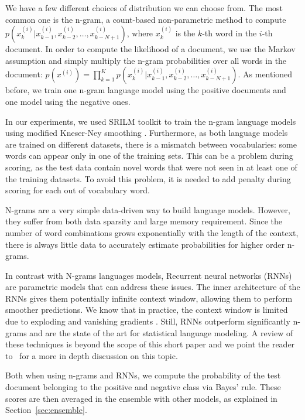 \documentclass{article} %
\begin{document}
We have a few different choices of distribution we can choose from. The most
common one is the n-gram, a count-based non-parametric method to compute
$p(x^{(i)}_{k} | x^{(i)}_{k-1}, x^{(i)}_{k-2}, \dots, x^{(i)}_{k-N+1})$, where $x^{(i)}_{k}$ is the $k$-th word
in the $i$-th document. In order to compute the likelihood of a document, we use
the Markov assumption and simply multiply the n-gram probabilities over all
words in the document: $p(x^{(i)}) = \prod_{k=1}^{K} p(x^{(i)}_{k} | x^{(i)}_{k-1}, x^{(i)}_{k-2},
\dots , x^{(i)}_{k-N+1})$. As mentioned before, we train one n-gram language model
using the positive documents and one model using the negative ones.

In our experiments, we used SRILM toolkit \citep{Srilm2002} to train the n-gram language
models using modified Kneser-Ney smoothing \citep{Kneser1995}. Furthermore, as both language
models are trained on different datasets, there is a mismatch between
vocabularies: some words can appear only in one of the training sets. This can
be a problem during scoring, as the test data contain novel words that were not
seen in at least one of the training datasets. To avoid this problem, it is
needed to add penalty during scoring for each out of vocabulary word.

N-grams are a very simple data-driven way to build language models. However,
they suffer from both data sparsity and large memory requirement. Since the
number of word combinations grows exponentially with the length of the context,
there is always little data to accurately estimate probabilities for higher
order n-grams.

In contrast with N-grams languages models, Recurrent neural networks
(RNNs)~\citep{Mikolov2010} are parametric models that can address these issues. The
inner architecture of the RNNs gives them potentially infinite context window,
allowing them to perform smoother predictions. We know that in practice, the
context window is limited due to exploding and vanishing gradients \citep{Pascanu2012}.
Still, RNNs outperform significantly n-grams and are the state of the art for
statistical language modeling. A review of these techniques is beyond the scope
of this short paper and we point the reader to~\citep{MikolovPhd}
for a more in depth discussion on this topic.

Both when using n-grams and RNNs, we compute the probability of the test
document belonging to the positive and negative class via Bayes' rule. These
scores are then averaged in the ensemble with other models, as explained in
Section~\ref{sec:ensemble}.
\end{document}

